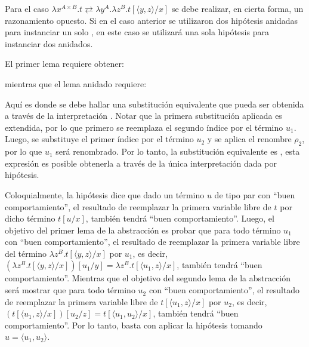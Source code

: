 
Para el caso  $\lambda x^{A \times B}. t \rightleftarrows \lambda y^A. \lambda z^B. t[\langle y, z \rangle/x]$ se debe realizar, en cierta forma, un razonamiento opuesto.
Si en el caso anterior se utilizaron dos hipótesis anidadas para instanciar un solo , en este caso se utilizará una sola hipótesis para instanciar dos  anidados.

El primer lema requiere obtener:
\begin{center}
\snstar{}
\end{center}
mientras que el lema anidado requiere:
\begin{center}
\snstar{}
\end{center}
Aquí es donde se debe hallar una substitución equivalente que pueda ser obtenida a través de la interpretación .
Notar que la primera substitución aplicada es extendida, por lo que primero se reemplaza el segundo índice por el término $u_1$.
Luego, se substituye el primer índice por el término $u_2$ y se aplica el renombre $\rho_2$, por lo que $u_1$ será renombrado.
Por lo tanto, la substitución equivalente es
\snstar{}, esta expresión es posible obtenerla a través de la única interpretación dada por hipótesis.

Coloquialmente, la hipótesis dice que dado un término $u$ de tipo par con ``buen comportamiento'', el resultado de reemplazar la primera variable libre de $t$ por dicho término $t[u/x]$, también tendrá ``buen comportamiento''.
Luego, el objetivo del primer lema de la abstracción es probar que para todo término $u_1$ con ``buen comportamiento'', el resultado de reemplazar la primera variable libre del término $\lambda z^B. t[\langle y, z \rangle/x]$ por $u_1$, es decir, $(\lambda z^B. t[\langle y, z \rangle/x])[u_1/y] = \lambda z^B. t[\langle u_1, z \rangle/x]$, también tendrá ``buen comportamiento''.
Mientras que el objetivo del segundo lema de la abstracción será mostrar que para todo término $u_2$ con ``buen comportamiento'', el resultado de reemplazar la primera variable libre de $t[\langle u_1, z \rangle/x]$ por $u_2$, es decir, $(t[\langle u_1, z \rangle/x])[u_2/z] = t[\langle u_1, u_2 \rangle/x]$, también tendrá ``buen comportamiento''.
Por lo tanto, basta con aplicar la hipótesis tomando $u = \langle u_1, u_2 \rangle$.

